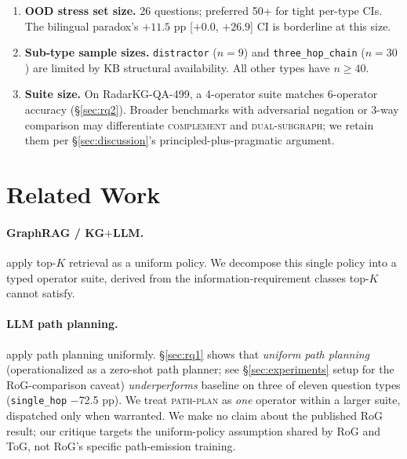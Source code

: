\documentclass[11pt,a4paper]{article}
\newcommand{\qtype}[1]{\texttt{\small #1}}
\newcommand{\op}[1]{\textsc{\small #1}}
\begin{document}
\begin{enumerate}[topsep=0pt,itemsep=2pt,leftmargin=*]
  \item \textbf{OOD stress set size.} 26 questions; preferred 50+ for tight per-type CIs. The bilingual paradox's $+11.5$ pp [$+0.0$, $+26.9$] CI is borderline at this size.
  \item \textbf{Sub-type sample sizes.} \qtype{distractor} ($n\!=\!9$) and \qtype{three\_hop\_chain} ($n\!=\!30$) are limited by KB structural availability. All other types have $n \geq 40$.
  \item \textbf{Suite size.} On RadarKG-QA-499, a 4-operator suite matches 6-operator accuracy (§\ref{sec:rq2}). Broader benchmarks with adversarial negation or 3-way comparison may differentiate \op{complement} and \op{dual-subgraph}; we retain them per §\ref{sec:discussion}'s principled-plus-pragmatic argument.
\end{enumerate}

\section{Related Work}
\label{sec:related}

\paragraph{GraphRAG / KG\texorpdfstring{$+$}{+}LLM.} \citet{edge2024graphrag,gutierrez2024hipporag,wang2024kgp,wen2024mindmap} apply top-$K$ retrieval as a uniform policy. We decompose this single policy into a typed operator suite, derived from the information-requirement classes top-$K$ cannot satisfy.

\paragraph{LLM path planning.} \citet{luo2024rog,sun2024tog,ma2025tog2} apply path planning uniformly. §\ref{sec:rq1} shows that \emph{uniform path planning} (operationalized as a zero-shot path planner; see §\ref{sec:experiments} setup for the RoG-comparison caveat) \emph{underperforms} baseline on three of eleven question types (\qtype{single\_hop} $-$72.5 pp). We treat \op{path-plan} as \emph{one} operator within a larger suite, dispatched only when warranted. We make no claim about the published RoG result; our critique targets the uniform-policy assumption shared by RoG and ToG, not RoG's specific path-emission training.
\end{document}
